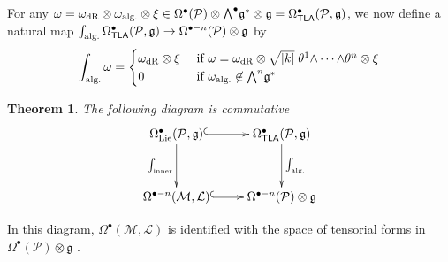 \documentclass[number]{elsarticle}
\newtheorem{theorem}{Theorem}[section]
\theoremstyle{definition}
\theoremstyle{remark}
\numberwithin{equation}{section}
\begin{document}
For any $\omega = \omega_{{\text{dR}}} \otimes \omega_{{\text{\textup{alg.}}}} \otimes \xi \in \Omega^{\bullet}({{{{\mathcal{{P}}}}}}) \otimes {{\textstyle\bigwedge}}^{\bullet} {{\mathfrak g}}^\ast \otimes {{\mathfrak g}} = \Omega^{\bullet}_{{{{\mathbf{\mathsf{{TLA}}}}}}}({{{{\mathcal{{P}}}}}},{{\mathfrak g}})$, we now define a natural map $\int_{{\text{\textup{alg.}}}} \Omega^{\bullet}_{{{{\mathbf{\mathsf{{TLA}}}}}}}({{{{\mathcal{{P}}}}}},{{\mathfrak g}}) \rightarrow \Omega^{{\bullet}-n}({{{{\mathcal{{P}}}}}}) \otimes {{\mathfrak g}}$ by
\begin{equation*}
\int_{{\text{\textup{alg.}}}} \omega  = 
\begin{cases}
\omega_{{\text{dR}}} \otimes \xi & \text{ if $\omega = \omega_{{\text{dR}}} \otimes \sqrt{|k|}\; \theta^1 {\mathord{\wedge}} \cdots {\mathord{\wedge}} \theta^n \otimes \xi$}\\
0 & \text{ if $\omega_{{\text{\textup{alg.}}}} \not\in {{\textstyle\bigwedge}}^n {{\mathfrak g}}^\ast$}
\end{cases}
\end{equation*}

\begin{theorem}
\label{thm-relationsdeRhamTLAAtiyah}
The following diagram is commutative
\begin{equation*}
\xymatrix@R=8ex{
  {\Omega^{\bullet}_{{\text{\textup{Lie}}}}({{{{\mathcal{{P}}}}}}, {{\mathfrak g}})} \ar@{^{(}->}[r] \ar[d]_-{\int_{{\text{\textup{inner}}}}}
& {\Omega^{\bullet}_{{{{\mathbf{\mathsf{{TLA}}}}}}}({{{{\mathcal{{P}}}}}},{{\mathfrak g}})} \ar[d]^-{\int_{{\text{\textup{alg.}}}}} 
\\
  {\Omega^{{\bullet}-n}({{{{\mathcal{{M}}}}}}, {{{{\mathcal{{L}}}}}})} \ar@{^{(}->}[r] 
& {\Omega^{{\bullet}-n}({{{{\mathcal{{P}}}}}}) \otimes {{\mathfrak g}}} 
 }
\end{equation*}
\end{theorem}

In this diagram, $\Omega^{\bullet}({{{{\mathcal{{M}}}}}}, {{{{\mathcal{{L}}}}}})$ is identified with the space of tensorial forms in $\Omega^{\bullet}({{{{\mathcal{{P}}}}}}) \otimes {{\mathfrak g}}$ \cite{KobaNomi96a}.
\end{document}
